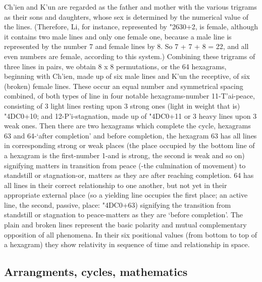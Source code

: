 \documentclass[11pt]{book}
\newcommand{\iching}[1]{{\dejavusanszh\char\numexpr"4DC0+#1}}
\newcommand{\trigram}[1]{{\dejavusans\char\numexpr"2630+#1}}
\begin{document}
Ch'ien and K'un are regarded as the father and mother with the various trigrams as their sons and daughters, whose sex is determined by the numerical value of the lines. (Therefore, Li, for instance, represented by \trigram{2}, is female, although it contains two male lines and only one female one, because a male line is represented by the number 7 and female lines by 8. So 7 + 7 + 8 = 22, and all even numbers are female, according to this system.) Combining these trigrams of three lines in pairs, we obtain 8 x 8 permutations, or the 64 hexagrams, beginning with Ch'ien, made up of six male lines and K'un the receptive, of six (broken) female lines. These occur an equal number and symmetrical spacing combined, of both types of line in four notable hexagrams-number 11-T'ai-peace, consisting of 3 light lines resting upon 3 strong ones (light in weight that is) \iching{10}; and 12-P'i-stagnation, made up of \iching{11} or 3 heavy lines upon 3 weak ones. Then there are two hexagrams which complete the cycle, hexagrams 63 and 64-`after completion' and before completion, the hexagram 63 has all lines in corresponding strong or weak places (the place occupied by the bottom line of a hexagram is the first-number 1-and is strong, the second is weak and so on) signifying matters in transition from peace (-the culmination of movement) to standstill or stagnation-or, matters as they are after reaching completion. 64 has all lines in their correct relationship to one another, but not yet in their appropriate external place (so a yielding line occupies the first place; an active line, the second, passive, place: \iching{63}) signifying the transition from standstill or stagnation to peace-matters as they are `before completion'. The plain and broken lines represent the basic polarity and mutual complementary opposition of all phenomena. In their six positional values (from bottom to top of a hexagram) they show relativity in sequence of time and relationship in space.


\subsection{Arrangments, cycles, mathematics}
\end{document}
